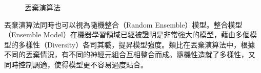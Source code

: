 \begin{itemize}
\begin{figure}[hb]
\centering
{}
\caption{丟棄演算法}
\end{figure}
	丟棄演算法同時也可以視為隨機整合（Random Ensemble）模型。整合模型
	（Ensemble
	Model）在機器學習領域已經被證明是非常強大的模型，藉由多個模型的多樣性（Diversity）各司其職，提昇模型強度。類比在丟棄演算法中，根據
	不同的丟棄情況，有不同的神經元組合互相整合而成。隨機性造就了多樣性，又
	同時控制調適，使得模型更不容易過度貼合。

\end{itemize}
